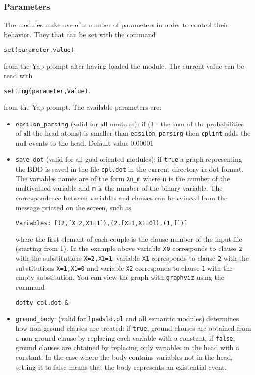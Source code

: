 \documentclass[a4paper,10pt]{article}
\newcommand{\href}[2]{\Link[#1]{}{} #2 \EndLink}
\begin{document}
\subsubsection{Parameters}
The modules make use of a number of parameters in order to control their behavior. They that can be set with the command
\begin{verbatim}
set(parameter,value).
\end{verbatim}
from the Yap prompt after having loaded the module.
The current value can be read with
\begin{verbatim}
setting(parameter,Value).
\end{verbatim}
from the Yap prompt.
The available parameters are:
\begin{itemize}
\item 
	 \verb|epsilon_parsing| (valid for all modules): if (1 - the sum of the probabilities of all the head atoms) is smaller than 
    \verb|epsilon_parsing|
		then \texttt{cplint} adds the null events to the head. Default value 0.00001
\item 	\verb|save_dot| (valid for all goal-oriented modules): if \texttt{true} a graph representing the BDD is saved in the file \texttt{cpl.dot} in the current directory in dot format.
		The variables names are of the form \verb|Xn_m| where \texttt{n} is the number of the multivalued
		variable and \texttt{m} is the number of the binary variable. The correspondence between variables and 
		clauses can be evinced from the message printed on the screen, such as 
\begin{verbatim}
Variables: [(2,[X=2,X1=1]),(2,[X=1,X1=0]),(1,[])]
\end{verbatim}
		where the first element of each couple is the clause number of the input file (starting from 1).
		In the example above variable \texttt{X0} corresponds to clause \texttt{2} with the substitutions \texttt{X=2,X1=1},
		variable \texttt{X1} corresponds to clause \texttt{2} with the substitutions \texttt{X=1,X1=0} and
		variable \texttt{X2} corresponds to clause \texttt{1} with the empty substitution.
		You can view the graph with  \href{www.graphviz.org}{\texttt{graphviz}} using the
		command
\begin{verbatim}
dotty cpl.dot &
\end{verbatim}
\item \verb|ground_body|: (valid for \texttt{lpadsld.pl} and all semantic modules) determines how non ground clauses are treated: if \texttt{true}, ground clauses are obtained from a non ground clause by replacing each variable with a constant, if \texttt{false}, ground clauses are obtained by replacing only variables in the head with a constant. In the case where the body contains variables not in the head, setting it to false means that the body represents an existential event.

\end{itemize}
\end{document}
